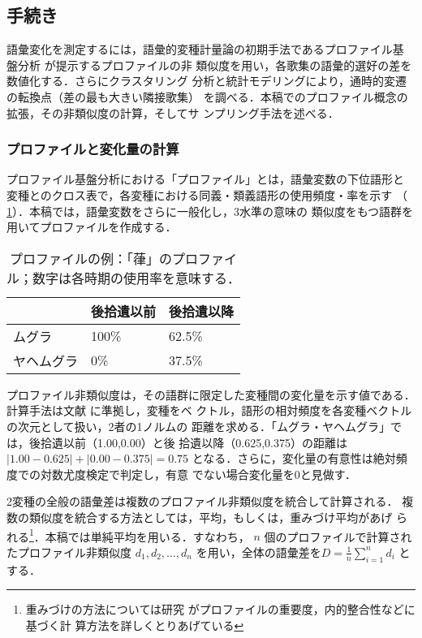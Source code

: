 \documentclass[submit]{ipsj}
\renewcommand{\ref}{\cref}
\begin{document}
\subsection{手続き\label{org0f2d405}}
\label{sec:orgb8479a4}
語彙変化を測定するには，語彙的変種計量論の初期手法であるプロファイル基
盤分析 \cite{Speelman2003Profilebased} が提示するプロファイルの非
類似度を用い，各歌集の語彙的選好の差を数値化する．さらにクラスタリング
分析と統計モデリングにより，通時的変遷の転換点（差の最も大きい隣接歌集）
を調べる．本稿でのプロファイル概念の拡張，その非類似度の計算，そしてサ
ンプリング手法を述べる．
\subsubsection{プロファイルと変化量の計算\label{orga874c7a}}
\label{sec:org8b983c5}
プロファイル基盤分析における「プロファイル」とは，語彙変数の下位語形と
変種とのクロス表で，各変種における同義・類義語形の使用頻度・率を示す
（ \ref{tab:org7c25cc0}）．本稿では，語彙変数をさらに一般化し，3水準の意味の
類似度をもつ語群を用いてプロファイルを作成する．

\begin{table}[t]
\caption{\label{tab:org7c25cc0}プロファイルの例：「葎」のプロファイル；数字は各時期の使用率を意味する．}
\centering
\begin{tabular}{lll}
 & 後拾遺以前 & 後拾遺以降\\
\hline
ムグラ & 100\% & 62.5\%\\
ヤヘムグラ & 0\% & 37.5\%\\
\end{tabular}
\end{table}

プロファイル非類似度は，その語群に限定した変種間の変化量を示す値である．
計算手法は文献 \cite{Speelman2003Profilebased}に準拠し，変種をベ
クトル，語形の相対頻度を各変種ベクトルの次元として扱い，2者の1ノルムの
距離を求める．「ムグラ・ヤヘムグラ」では，後拾遺以前（1.00,0.00）と後
拾遺以降（0.625,0.375）の距離は \(|1.00 - 0.625|+|0.00-0.375|=0.75\)
となる．さらに，変化量の有意性は絶対頻度での対数尤度検定で判定し，有意
でない場合変化量を0と見做す．

2変種の全般の語彙差は複数のプロファイル非類似度を統合して計算される．
複数の類似度を統合する方法としては，平均，もしくは，重みづけ平均があげ
られる\footnote{重みづけの方法については研究 \cite{Ruette2014Semantic} がプロファイルの重要度，内的整合性などに基づく計
算方法を詳しくとりあげている}．本稿では単純平均を用いる．すなわち，
\(n\) 個のプロファイルで計算されたプロファイル非類似度 \(d_1, d_2,
\ldots, d_n\) を用い，全体の語彙差を\(D=\frac{1}{n} \sum_{i=1}^{n}
d_i\) とする．
\end{document}

